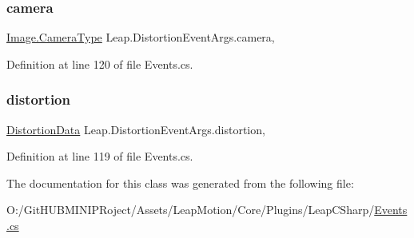 \subsubsection{\texorpdfstring{camera}{camera}}
{\footnotesize\ttfamily \mbox{\hyperlink{class_leap_1_1_image_a28310e43e0f2d7f7117e1b45330bdc38}{Image.\+Camera\+Type}} Leap.\+Distortion\+Event\+Args.\+camera\hspace{0.3cm}{\ttfamily [get]}, {}}



Definition at line 120 of file Events.\+cs.

\mbox{\label{class_leap_1_1_distortion_event_args_aa06063f50cce254897edbc9b952ca4eb}} 
\subsubsection{\texorpdfstring{distortion}{distortion}}
{\footnotesize\ttfamily \mbox{\hyperlink{class_leap_1_1_distortion_data}{Distortion\+Data}} Leap.\+Distortion\+Event\+Args.\+distortion\hspace{0.3cm}{\ttfamily [get]}, {}}



Definition at line 119 of file Events.\+cs.



The documentation for this class was generated from the following file\+:\begin{DoxyCompactItemize}
\item 
O\+:/\+Git\+H\+U\+B\+M\+I\+N\+I\+P\+Roject/\+Assets/\+Leap\+Motion/\+Core/\+Plugins/\+Leap\+C\+Sharp/\mbox{\hyperlink{_events_8cs}{Events.\+cs}}\end{DoxyCompactItemize}
